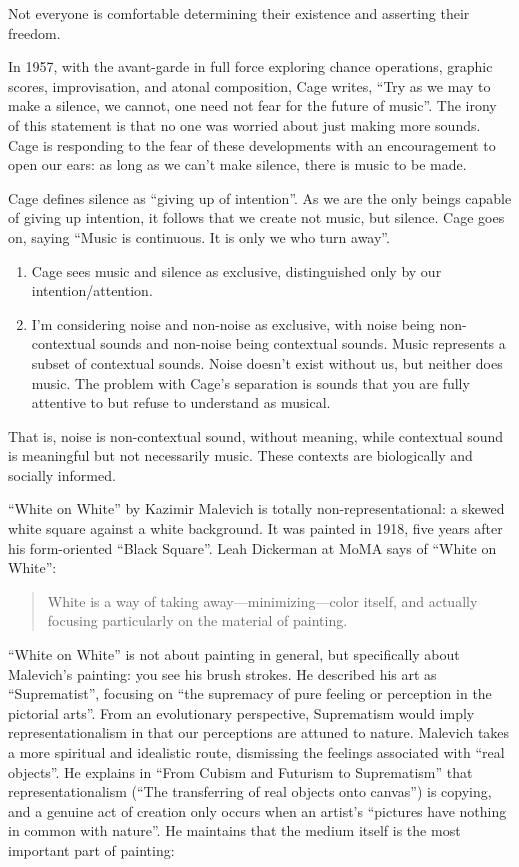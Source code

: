 \documentclass{thesis}
\begin{document}
	Not everyone is comfortable determining their existence and asserting their freedom.
	
	In 1957, with the avant-garde in full force exploring chance operations, graphic scores, improvisation, and atonal composition, Cage writes, ``Try as we may to make a silence, we cannot, one need not fear for the future of music''. The irony of this statement is that no one was worried about just making more sounds. Cage is responding to the fear of these developments with an encouragement to open our ears: as long as we can't make silence, there is music to be made.
	
	Cage defines silence as ``giving up of intention''. As we are the only beings capable of giving up intention, it follows that we create not music, but silence. Cage goes on, saying ``Music is continuous. It is only we who turn away''.
	
\begin{enumerate}
	\item Cage sees music and silence as exclusive, distinguished only by our intention/attention.
	\item I'm considering noise and non-noise as exclusive, with noise being non-contextual sounds and non-noise being contextual sounds. Music represents a subset of contextual sounds. Noise doesn't exist without us, but neither does music. The problem with Cage's separation is sounds that you are fully attentive to but refuse to understand as musical.
\end{enumerate}

That is, noise is non-contextual sound, without meaning, while contextual sound is meaningful but not necessarily music. These contexts are biologically and socially informed.

``White on White'' by Kazimir Malevich is totally non-representational: a skewed white square against a white background. It was painted in 1918, five years after his form-oriented ``Black Square''. Leah Dickerman at MoMA says of ``White on White''\cite{moma_kazimir_2006}:
	
	\begin{quote}
	White is a way of taking away---minimizing---color itself, and actually focusing particularly on the material of painting.
	\end{quote}
	
``White on White'' is not about painting in general, but specifically about Malevich's painting: you see his brush strokes. He described his art as ``Suprematist'', focusing on ``the supremacy of pure feeling or perception in the pictorial arts''. From an evolutionary perspective, Suprematism would imply representationalism in that our perceptions are attuned to nature. Malevich takes a more spiritual and idealistic route, dismissing the feelings associated with ``real objects''. He explains in ``From Cubism and Futurism to Suprematism'' that representationalism (``The transferring of real objects onto canvas'') is copying, and a genuine act of creation only occurs when an artist's ``pictures have nothing in common with nature''. He maintains that the medium itself is the most important part of painting:
	
\end{document}
